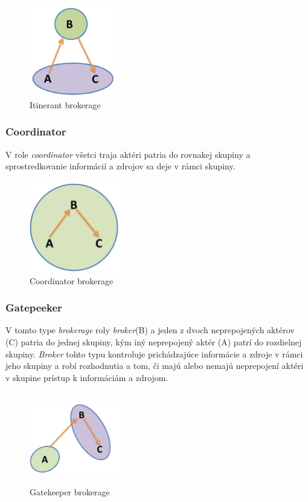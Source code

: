\documentclass[slovak,master,public,dept460,male,cpdeclaration,oneside]{diploma}
\begin{document}
\begin{figure}[H]
\centering
\includegraphics[width=4cm, height=4cm]{figures/itineran}
\caption{Itinerant brokerage}
\end{figure}

\subsubsection{Coordinator}
V role \textit{coordinator} všetci traja aktéri patria do rovnakej skupiny a sprostredkovanie informácií a zdrojov sa deje v rámci skupiny. 

\begin{figure}[H]
\centering
\includegraphics[width=4cm, height=4cm]{figures/coordinator}
\caption{Coordinator brokerage}
\end{figure}

\subsubsection{Gatepeeker}
V tomto type \textit{brokerage} roly \textit{broker}(B) a jeden z dvoch neprepojených aktérov (C) patria do jednej skupiny, kým iný neprepojený aktér (A) patrí do rozdielnej skupiny. \textit{Broker} tohto typu kontroluje prichádzajúce informácie a zdroje v rámci jeho skupiny a robí rozhodnutia a tom, či majú alebo nemajú neprepojení aktéri v skupine prístup k informáciám a zdrojom. 

\begin{figure}[H]
\centering
\includegraphics[width=4cm, height=4cm]{figures/gatepeeker}
\caption{Gatekeeper brokerage}
\end{figure}
\end{document}
